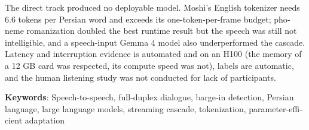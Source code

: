 \begin{latin}
The direct track produced no deployable model. Moshi's English tokenizer needs
6.6 tokens per Persian word and exceeds its one-token-per-frame budget;
phoneme romanization doubled the best runtime result but the speech was still
not intelligible, and a speech-input Gemma 4 model also underperformed the
cascade. Latency and interruption evidence is automated and on an H100 (the
memory of a 12 GB card was respected, its compute speed was not), labels are
automatic, and the human listening study was not conducted for lack of participants.

\bigskip\noindent\textbf{Keywords}:
Speech-to-speech, full-duplex dialogue, barge-in detection, Persian language,
large language models, streaming cascade, tokenization, parameter-efficient adaptation

\end{latin}
